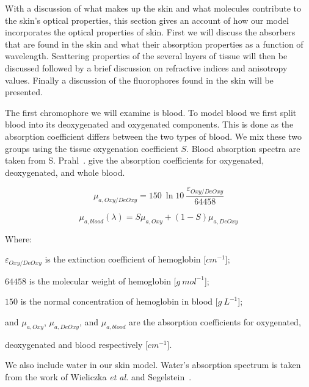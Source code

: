
With a discussion of what makes up the skin and what molecules contribute to the skin's optical properties, this section gives an account of how our model incorporates the optical properties of skin.
First we will discuss the absorbers that are found in the skin and what their absorption properties as a function of wavelength.
Scattering properties of the several layers of tissue will then be discussed followed by a brief discussion on refractive indices and anisotropy values.
Finally a discussion of the fluorophores found in the skin will be presented.

\medskip

The first chromophore we will examine is blood.
To model blood we first split blood into its deoxygenated and oxygenated components.
This is done as the absorption coefficient differs between the two types of blood. We mix these two groups using the tissue oxygenation coefficient $S$. Blood absorption spectra are taken from S. Prahl~\cite{prahlblood}.
 give the absorption coefficients for oxygenated, deoxygenated, and whole blood.


\begin{equation}
\mu_{a,Oxy/DeOxy}=150\ \ln10\ \frac{\varepsilon_{Oxy/DeOxy}}{64458}
\label{eqn:oxy}
\end{equation}

\begin{equation}
\mu_{a,blood}(\lambda) = S\mu_{a,Oxy}+(1-S)\mu_{a,DeOxy}
\label{eqn:blood}
\end{equation}

\noindent Where:

\indent $\varepsilon_{Oxy/DeOxy}$ is the extinction coefficient of hemoglobin [$cm^{-1}$];

\indent $64458$ is the molecular weight of hemoglobin [$g\ mol^{-1}$];

\indent $150$ is the normal concentration of hemoglobin in blood [$g\ L^{-1}$];

\indent and $\mu_{a,Oxy}$, $\mu_{a,DeOxy}$, and $\mu_{a,blood}$ are the absorption coefficients for oxygenated, 

\indent deoxygenated and blood respectively [$cm^{-1}$].

\medskip

We also include water in our skin model.
Water's absorption spectrum is taken from the work of Wieliczka \textit{et al.} and Segelstein~\cite{wieliczka1989wedge,segelstein1981complex}.

